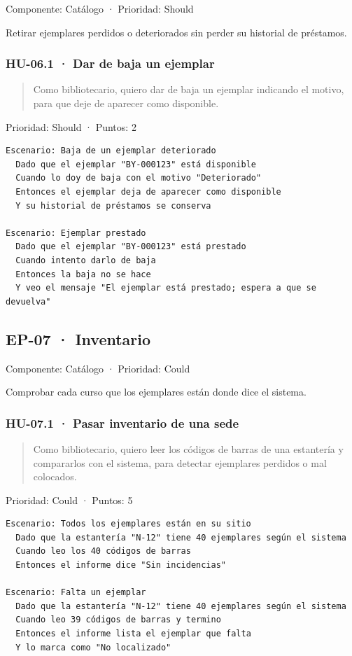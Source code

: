 \documentclass[11pt,a4paper]{article}
\begin{document}
Componente: Catálogo · Prioridad: Should

Retirar ejemplares perdidos o deteriorados sin perder su historial de préstamos.

\subsubsection*{HU-06.1 · Dar de baja un ejemplar}

\begin{quote}
Como bibliotecario, quiero dar de baja un ejemplar indicando el motivo, para que deje de aparecer como disponible.
\end{quote}

Prioridad: Should · Puntos: 2

\begin{Verbatim}[breaklines,fontsize=\small,frame=single,framerule=0.4pt,rulecolor=\color{black!25}]
Escenario: Baja de un ejemplar deteriorado
  Dado que el ejemplar "BY-000123" está disponible
  Cuando lo doy de baja con el motivo "Deteriorado"
  Entonces el ejemplar deja de aparecer como disponible
  Y su historial de préstamos se conserva

Escenario: Ejemplar prestado
  Dado que el ejemplar "BY-000123" está prestado
  Cuando intento darlo de baja
  Entonces la baja no se hace
  Y veo el mensaje "El ejemplar está prestado; espera a que se devuelva"
\end{Verbatim}

\subsection*{EP-07 · Inventario}

Componente: Catálogo · Prioridad: Could

Comprobar cada curso que los ejemplares están donde dice el sistema.

\subsubsection*{HU-07.1 · Pasar inventario de una sede}

\begin{quote}
Como bibliotecario, quiero leer los códigos de barras de una estantería y compararlos con el sistema, para detectar ejemplares perdidos o mal colocados.
\end{quote}

Prioridad: Could · Puntos: 5

\begin{Verbatim}[breaklines,fontsize=\small,frame=single,framerule=0.4pt,rulecolor=\color{black!25}]
Escenario: Todos los ejemplares están en su sitio
  Dado que la estantería "N-12" tiene 40 ejemplares según el sistema
  Cuando leo los 40 códigos de barras
  Entonces el informe dice "Sin incidencias"

Escenario: Falta un ejemplar
  Dado que la estantería "N-12" tiene 40 ejemplares según el sistema
  Cuando leo 39 códigos de barras y termino
  Entonces el informe lista el ejemplar que falta
  Y lo marca como "No localizado"
\end{Verbatim}
\end{document}
